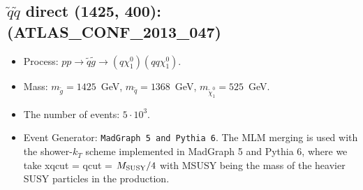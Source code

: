 \documentclass[12pt]{article}
\begin{document}
    
\subsection{$\tilde q \tilde q$ direct (1425, 400): (ATLAS\_CONF\_2013\_047)} 


        \begin{itemize}
        \item  Process: $pp \to \tilde q \tilde g \to (q \chi_1^0)(q q \chi_1^0)$.
        \item  Mass: $m_{\tilde g} = 1425$~GeV, $m_{\tilde q} = 1368$~GeV, $m_{\tilde \chi_1^0} = 525$~GeV.
        \item  The number of events: $5 \cdot 10^3$.
        \item  Event Generator: {\tt MadGraph 5 and Pythia 6}.
                The MLM merging is used with the shower-$k_T$ scheme implemented in MadGraph 5 and Pythia 6, where we take xqcut = qcut = $M_{\rm SUSY}/4$ with MSUSY being the mass of the heavier SUSY particles in the production.      
        \end{itemize}    
    
\end{document}
